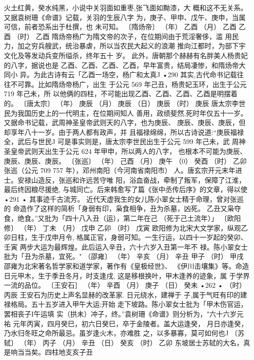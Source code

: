 火土红黄，癸水纯黑，小说中关羽面如重枣,张飞面如黝漆，大
概和这不无关系。又据袁树珊《命谱》记载，关羽的生辰八字
为，庚子、甲申、戊午、庚申，当属可信，前者恐系出于杜撰，也
未可知。
〔隋炀帝〕
（年） 乙酉
（月） 乙酉
乙酉
（时） 乙酉
隋炀帝杨广为隋文帝的次子，在位期间由于荒淫奢侈，滥
用民力，加之穷兵艘武，统治暴虐，所以当农民大起义的浪潮
推向江都时，为部下宇文化及等发动兵变所缢杀，终年五十
岁。
此外，唐朝那个赫赫有名胖美人杨贵妃的八字，据说也是
乙酉、乙酉、乙酉、乙酉，早年富贵，结局凄惨，和隋炀帝大同小
异。为此古诗有云「乙酉一场空，杨广和太真J
•290
其实,古代命书记载往往不可靠。比如隋炀帝杨广，出生
于公元 569 年己丑，杨贵妃玉环，出生于公元 719 年己未，所
以他俩的四柱，不可能出现乙酉、乙酉、乙酉、乙酉是明摆着
的。
〔唐太宗〕
（年） 庚辰
（月） 庚辰
（日） 庚辰
（时） 庚辰
唐太宗李世民为我国历史上的一代明主，在位期间知人
善用，政绩斐然,死时年仅五十一岁。
又据命书记载，武周神圣皇帝武则天的八字，也为庚辰、
庚辰、庚辰、庚辰，但却享年八十一岁。由于两人都有政声，并
且福禄绵绵，所以古诗说道:“庚辰福禄全，武后与世民J
可是事实则是，唐太宗李世民出生于公元 599 年己未，武
周神圣皇帝武则天出生于公元 624 年甲申，所以两人的八字，
也根本不可能为庚辰、庚辰、庚辰、庚辰。
〔张巡〕
（年） 己酉
（月） 庚午
（0） 癸酉
（时） 乙卯
张巡（公元 709 757 年），邓州南阳（今河南省南阳市）
人。唐玄宗开元末年进士。安禄山造反，张巡和许远苦守唯
阳，浴血奋战，牵制了叛军，保障了江淮，最后终因粮尽援绝,
与城同亡。后来韩愈写了篇《张中丞传后序》的文章，得以使
•291 •
其事迹千古流芳。
近代天虚我生的女儿陈小翠女士精于命理，曾对张巡的
命造作了这样的简析「身弱有印，枭食相争，丑为杀墓，凶死。
乙丑又枭夺食，绝食。”又批为「四十八入丑（运），第二年在己
（死于己土流年）」
〔欧阳修〕
（年） 丁未
（月） 戊申
乙卯
（时） 戊寅
欧阳修为北宋大文学家，纵观乙卯日柱，生于戊申月令,
格属正官，身弱可知。一生行运，以四十一岁起的癸卯、壬寅
两步大运为最辉煌。此后运入辛丑，六十六岁入丑第一年不
禄。陈小翠女士批为「丑为杀墓，宜死。"
（邵雍〕
（年） 辛亥
（月） 辛丑
甲子
（时） 甲戌
邵雍为北宋著名哲学家和道学家，著作有《皇极经世》、
《伊川击壤集》等。命造日元甲木，生于季丑冬月，时支逢戌,
这是移根换叶，甲木逢养的迹象，属 于学界一流的品位。
〔王安石］
（年） 辛酉
（月） 庚子
（日） 癸未
•262 •
（时） 丙辰
王安石为历史上声名显赫的改革家. 日元绕水，建禅于
子,属于气旺有印的建禄格局。五十五岁进入甲午大运;开始
走下坡路。陈小翠女士批为「甲木伤官运，罢相丧子I午运填
实（拱未）冲子，终。”袁树珊《命谱》则分析为，"六十六岁元祐
元年丙寅，四月癸巳，初六日癸巳，卒于金陵者。盖大运逢癸，
月日亦逢癸，乃水归冬旺之命所最忌。虽岁逢火木，亦难胜
之，以多暴寡，莫可如何也J
〔苏轼〕
（年） 丙子
（月） 辛丑
（日） 癸亥
（时） 乙卯
东坡居士苏轼的大名，真是响当当矣。四柱地支亥子丑

